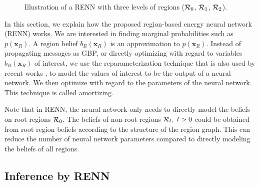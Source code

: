 \begin{figure}[!t]
  
  \caption{Illustration of a RENN with three levels of regions ($\mathcal{R}_0$, $\mathcal{R}_1$, $\mathcal{R}_2$).}
  \label{fig:renn-illustration}
  
\end{figure}


In this section, we explain how the proposed region-based energy neural network (RENN) works.
We are interested in finding marginal probabilities such as $p(\bm{x}_R)$. A region belief $b_R(\bm{x}_R)$ is an approximation to $p(\bm{x}_R)$.
Instead of propagating messages as GBP, or directly optimizing with regard to variables ${b_R(\bm{x}_R)}$ of interest, we use the reparameterization technique that is also used by recent works \cite{DBLP:journals/corr/KingmaW13, srikumar-etal-2012-amortizing, NIPS2019_9687, akbayrak2019reparameterization}, to model the values of interest to be the output of a neural network. We then optimize with regard to the parameters of the neural network. This technique is called amortizing.

Note that in RENN, the neural network only needs to directly model the beliefs on root regions $\mathcal{R}_0$. The beliefs of non-root regions $\mathcal{R}_l,~l>0$ could be obtained from root region beliefs according to the structure of the region graph. This can reduce the number of neural network parameters compared to directly modeling the beliefs of all regions.

\subsection{Inference by RENN}
\label{sec:infer-renn}

